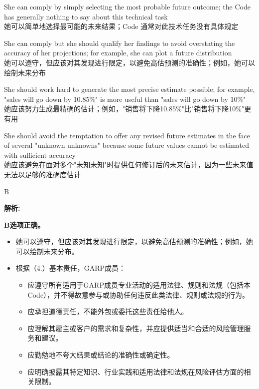 \documentclass{article}
\newenvironment{explanation}
{\textbf{解析:}\par}
{\par}
\begin{document}
    \begin{choices}
        \item She can comply by simply selecting the most probable future outcome; the Code has generally nothing to say about this technical task
        \\她可以简单地选择最可能的未来结果；Code 通常对此技术任务没有具体规定
        \item She can comply but she should qualify her findings to avoid overstating the accuracy of her projections; for example, she can plot a future distribution
        \\她可以遵守，但应该对其发现进行限定，以避免高估预测的准确性；例如，她可以绘制未来分布
        \item She should work hard to generate the most precise estimate possible; for example, "sales will go down by 10.85\%" is more useful than "sales will go down by 10\%"
        \\她应该努力生成最精确的估计；例如，"销售将下降10.85\%"比"销售将下降10\%"更有用
        \item She should avoid the temptation to offer any revised future estimates in the face of several "unknown unknowns" because some future values cannot be estimated with sufficient accuracy
        \\她应该避免在面对多个"未知未知"时提供任何修订后的未来估计，因为一些未来值无法以足够的准确度估计
    \end{choices}
    
    \begin{correctanswer}
        B
    \end{correctanswer}
    
    \begin{explanation}
        \textbf{B选项正确。}
        \begin{itemize}
            \item 她可以遵守，但应该对其发现进行限定，以避免高估预测的准确性；例如，她可以绘制未来分布。
            \item 根据（4.）基本责任，GARP成员：
        \begin{itemize}
            \item[4.1] 应遵守所有适用于GARP成员专业活动的适用法律、规则和法规（包括本Code），并不得故意参与或协助任何违反此类法律、规则或法规的行为。
            \item[4.2] 应承担道德责任，不能外包或委托这些责任给他人。
            \item[4.3] 应理解其雇主或客户的需求和复杂性，并应提供适当和合适的风险管理服务和建议。
            \item[4.4] 应勤勉地不夸大结果或结论的准确性或确定性。
            \item[4.5] 应明确披露其特定知识、行业实践和适用法律和法规在风险评估方面的相关限制。
        \end{itemize}
        
    \end{itemize}
    \end{explanation}
\end{document}
